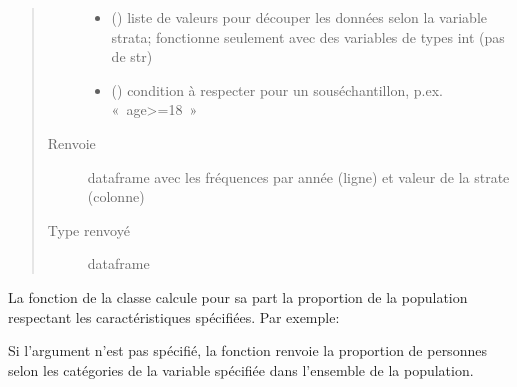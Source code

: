 \documentclass[letterpaper,10pt,french]{sphinxmanual}
\begin{document}
\begin{fulllineitems}
\begin{fulllineitems}
\begin{quote}
\begin{description}
\begin{itemize}
\item {} 
 () \textendash{} liste de valeurs pour découper les données selon la variable strata; fonctionne seulement avec des variables de types int (pas de str)

\item {} 
 () \textendash{} condition à respecter pour un sous\sphinxhyphen{}échantillon, p.ex. « age\textgreater{}=18 »

\end{itemize}

\item[{Renvoie}] \leavevmode
dataframe avec les fréquences par année (ligne) et valeur de la strate (colonne)

\item[{Type renvoyé}] \leavevmode
dataframe

\end{description}\end{quote}

\end{fulllineitems}


\end{fulllineitems}


\begin{DUlineblock}{0em}
\item[] 
\end{DUlineblock}


La fonction  de la classe  calcule pour sa part la proportion de la population respectant les caractéristiques spécifiées. Par exemple:

\begin{sphinxVerbatim}[commandchars=\\\{\}]
   
\end{sphinxVerbatim}

Si l’argument  n’est pas spécifié, la fonction renvoie la proportion de personnes selon les catégories de la variable spécifiée dans l’ensemble de la population.
\end{document}
